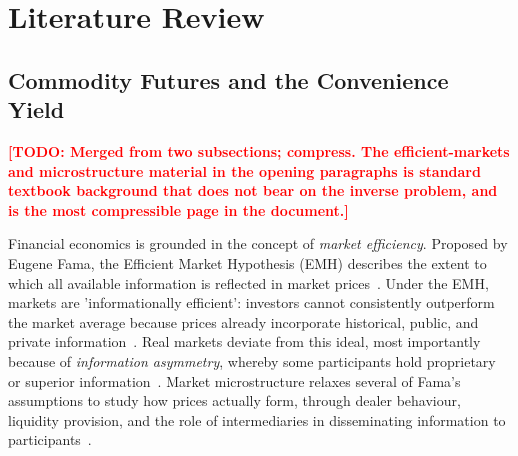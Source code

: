 \documentclass[11pt, a4paper]{article}
\newcommand{\todo}[1]{\textcolor{red}{\textbf{[TODO: #1]}}}
\begin{document}



\section{Literature Review}
\label{sec:literature}

\subsection{Commodity Futures and the Convenience Yield}
\label{sec:fin_fun}
\label{sec:lit_commodity_merged}
\todo{Merged from two subsections; compress. The efficient-markets and
  microstructure material in the opening paragraphs is standard textbook
  background that does not bear on the inverse problem, and is the most
  compressible page in the document.}

Financial economics is grounded in the concept of \textit{market efficiency}. Proposed by Eugene Fama, the Efficient Market Hypothesis (EMH) describes the extent to which all available information is reflected in market prices~\cite{Fama1970EfficientWork, ShivakumarGT.2018TheEfficieny}. Under the EMH, markets are 'informationally efficient': investors cannot consistently outperform the market average because prices already incorporate historical, public, and private information~\cite{ShivakumarGT.2018TheEfficieny}. Real markets deviate from this ideal, most importantly because of \textit{information asymmetry}, whereby some participants hold proprietary or superior information~\cite{ShivakumarGT.2018TheEfficieny}. Market microstructure relaxes several of Fama's assumptions to study how prices actually form, through dealer behaviour, liquidity provision, and the role of intermediaries in disseminating information to participants~\cite{deJong2009Introduction}.
\end{document}
